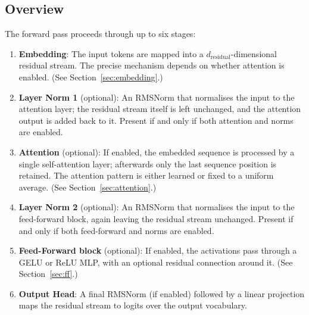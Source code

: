 \documentclass[11pt,a4paper]{article}
\begin{document}
\subsection{Overview}

The forward pass proceeds through up to six stages:
\begin{enumerate}[nosep]
    \item \textbf{Embedding}: The input tokens are mapped into a $d_\text{residual}$-dimensional residual stream. The precise mechanism depends on whether attention is enabled. (See Section~\ref{sec:embedding}.)
    \item \textbf{Layer Norm 1} (optional): An RMSNorm that normalises the input to the attention layer; the residual stream itself is left unchanged, and the attention output is added back to it. Present if and only if both attention and norms are enabled.
    \item \textbf{Attention} (optional): If enabled, the embedded sequence is processed by a single self-attention layer; afterwards only the last sequence position is retained. The attention pattern is either learned or fixed to a uniform average. (See Section~\ref{sec:attention}.)
    \item \textbf{Layer Norm 2} (optional): An RMSNorm that normalises the input to the feed-forward block, again leaving the residual stream unchanged. Present if and only if both feed-forward and norms are enabled.
    \item \textbf{Feed-Forward block} (optional): If enabled, the activations pass through a GELU or ReLU MLP, with an optional residual connection around it. (See Section~\ref{sec:ff}.)
    \item \textbf{Output Head}: A final RMSNorm (if enabled) followed by a linear projection maps the residual stream to logits over the output vocabulary.
\end{enumerate}
\end{document}
